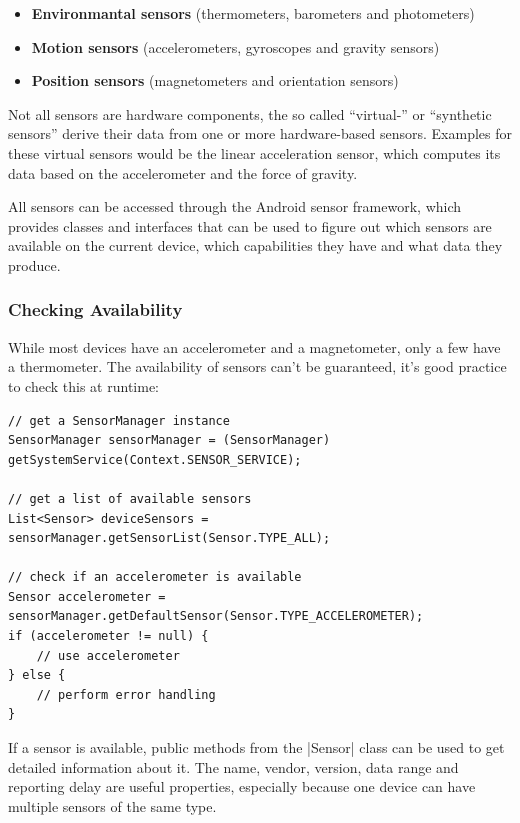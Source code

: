 \begin{itemize}[noitemsep]
	\item \textbf{Environmantal sensors} (thermometers, barometers and photometers)
	\item \textbf{Motion sensors} (accelerometers, gyroscopes and gravity sensors)
	\item \textbf{Position sensors} (magnetometers and orientation sensors)
\end{itemize}

Not all sensors are hardware components, the so called ``virtual-'' or ``synthetic sensors'' derive their data from one or more hardware-based sensors.
Examples for these virtual sensors would be the linear acceleration sensor, which computes its data based on the accelerometer and the force of gravity.

All sensors can be accessed through the Android sensor framework, which provides classes and interfaces that can be used to figure out which sensors are available on the current device, which capabilities they have and what data they produce.

\subsubsection{Checking Availability}
\label{sec:implementation:checkingavailability}
While most devices have an accelerometer and a magnetometer, only a few have a thermometer.
The availability of sensors can't be guaranteed, it's good practice to check this at runtime:

\begin{lstlisting}[label=getsensormanager]
// get a SensorManager instance
SensorManager sensorManager = (SensorManager) getSystemService(Context.SENSOR_SERVICE);

// get a list of available sensors
List<Sensor> deviceSensors = sensorManager.getSensorList(Sensor.TYPE_ALL);

// check if an accelerometer is available
Sensor accelerometer = sensorManager.getDefaultSensor(Sensor.TYPE_ACCELEROMETER);
if (accelerometer != null) {
	// use accelerometer
} else {
	// perform error handling
}
\end{lstlisting}

If a sensor is available, public methods from the |Sensor|\cite{androiddocs:sensor} class can be used to get detailed information about it.
The name, vendor, version, data range and reporting delay are useful properties, especially because one device can have multiple sensors of the same type.

